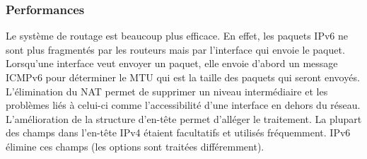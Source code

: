 \subsubsection{Performances}

Le système de routage est beaucoup plus efficace. En effet, les paquets IPv6 ne sont plus
fragmentés par les routeurs mais par l'interface qui envoie le paquet. Lorsqu'une interface
veut envoyer un paquet, elle envoie d'abord un message ICMPv6 pour déterminer le MTU qui est 
la taille des paquets qui seront envoyés.
\\
L'élimination du NAT permet de supprimer un niveau intermédiaire et les problèmes liés à celui-ci
 comme l'accessibilité d'une interface en dehors du réseau.
\\	
L'amélioration de la structure d'en-tête permet d'alléger le traitement. La
plupart des champs dans l'en-tête IPv4 étaient facultatifs et utilisés
fréquemment. IPv6 élimine ces champs (les options sont traitées différemment).
